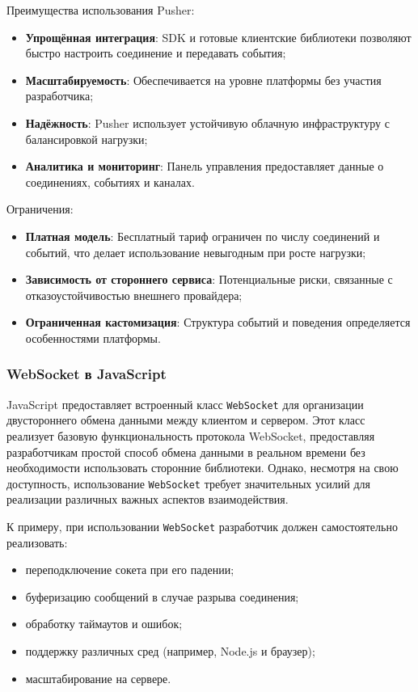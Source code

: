 Преимущества использования Pusher:
\begin{itemize}
  \item \textbf{Упрощённая интеграция}: SDK и готовые клиентские библиотеки позволяют быстро настроить соединение и передавать события;
  \item \textbf{Масштабируемость}: Обеспечивается на уровне платформы без участия разработчика;
  \item \textbf{Надёжность}: Pusher использует устойчивую облачную инфраструктуру с балансировкой нагрузки;
  \item \textbf{Аналитика и мониторинг}: Панель управления предоставляет данные о соединениях, событиях и каналах.
\end{itemize}

Ограничения:
\begin{itemize}
  \item \textbf{Платная модель}: Бесплатный тариф ограничен по числу соединений и событий, что делает использование невыгодным при росте нагрузки;
  \item \textbf{Зависимость от стороннего сервиса}: Потенциальные риски, связанные с отказоустойчивостью внешнего провайдера;
  \item \textbf{Ограниченная кастомизация}: Структура событий и поведения определяется особенностями платформы.
\end{itemize}

\subsubsection*{WebSocket в JavaScript}

JavaScript предоставляет встроенный класс \texttt{WebSocket} для организации двустороннего обмена данными между клиентом и сервером\cite{mdn_websocket_api}. Этот класс реализует базовую функциональность протокола WebSocket, предоставляя разработчикам простой способ обмена данными в реальном времени без необходимости использовать сторонние библиотеки. Однако, несмотря на свою доступность, использование \texttt{WebSocket} требует значительных усилий для реализации различных важных аспектов взаимодействия.

К примеру, при использовании \texttt{WebSocket} разработчик должен самостоятельно реализовать:
\begin{itemize}
  \item переподключение сокета при его падении;
  \item буферизацию сообщений в случае разрыва соединения;
  \item обработку таймаутов и ошибок;
  \item поддержку различных сред (например, Node.js и браузер);
  \item масштабирование на сервере.
\end{itemize}


